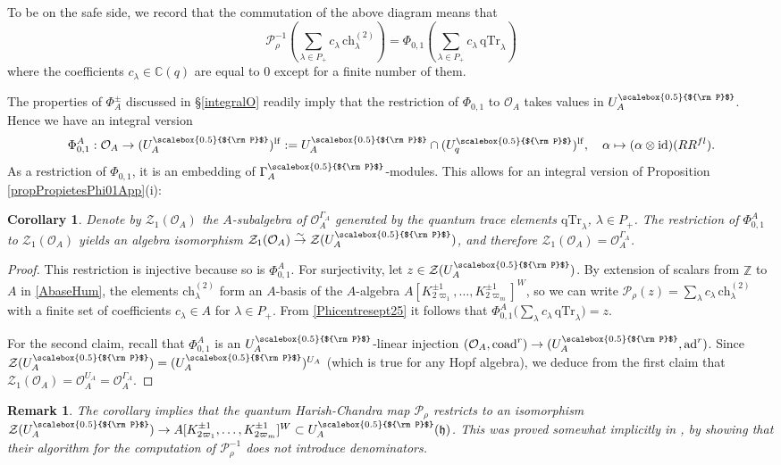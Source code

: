 \documentclass[11pt]{amsart}
\newtheorem{cor}[teo]{Corollary}
\newtheorem{remark}[teo]{Remark}
\newcommand{\Oo}{\mathcal{O}}
\newcommand{\Pup}{{\scalebox{0.5}{${\rm P}$}}}
\begin{document}
To be on the safe side, we record that the commutation of the above diagram means that
\begin{equation}\label{Phicentresept25}
\textstyle \mathcal{P}_\rho^{-1 }\left( \sum_{\lambda \in P_+} c_\lambda \, \mathrm{ch}^{(2)}_\lambda \right) =  \Phi_{0,1}\left(\sum_{\lambda \in P_+}  c_\lambda \, \mathrm{qTr}_\lambda\right)
 \end{equation} 
where the coefficients $c_\lambda \in \mathbb{C}(q)$ are equal to $0$ except for a finite number of them.

\smallskip

\indent The properties of $\Phi_A^\pm$ discussed in \S\ref{integralO} readily imply that the restriction of $\Phi_{0,1}$ to $\mathcal{O}_A$ takes values in $U_A^\Pup$. Hence we have an integral version
\[ \Phi_{0,1}^A : \Oo_A \to (U_A^\Pup)^{\mathrm{lf}} := U_A^\Pup\cap (U_q^\Pup)^{\rm lf}, \quad \alpha \mapsto (\alpha \otimes \mathrm{id})(RR^{fl}). \]
As a restriction of $\Phi_{0,1}$, it is an embedding of $\Gamma_A^\Pup$-modules. This allows for an integral version of Proposition \ref{propPropietesPhi01App}(i):
\begin{cor}\label{Phi0Aiso} Denote by $\mathcal{Z}_1(\Oo_A)$ the $A$-subalgebra of $\Oo_A^{\Gamma_A}$ generated by the quantum trace elements $\mathrm{qTr}_\lambda$, $\lambda \in P_+$. The restriction of $\Phi_{0,1}^A$ to $\mathcal{Z}_1(\Oo_A)$ yields an algebra isomorphism $\mathcal{Z}_1(\Oo_A) \overset{\sim}{\to} \mathcal{Z}(U_A^\Pup)$, and therefore $\mathcal{Z}_1(\Oo_A)=\Oo_A^{\Gamma_A}$.
\end{cor}

\begin{proof} This restriction is injective because so is $\Phi_{0,1}^A$. For surjectivity, let $z\in \mathcal{Z}(U_A^\Pup)$. By extension of scalars from $\mathbb{Z}$ to $A$ in \eqref{AbaseHum}, the elements $\textstyle \mathrm{ch}^{(2)}_\lambda$ form an $A$-basis of the $A$-algebra $A[K_{2\varpi_1}^{\pm 1},\ldots, K_{2\varpi_m}^{\pm 1}]^W$, so we can write $\textstyle \mathcal{P}_\rho(z) =  \sum_\lambda  c_\lambda\, \mathrm{ch}^{(2)}_\lambda$ with a finite set of coefficients $c_\lambda\in A$ for $\lambda\in P_+$. From \eqref{Phicentresept25} it follows that $\textstyle \Phi_{0,1}^A\bigl(\sum_\lambda  c_\lambda\, \mathrm{qTr}_\lambda\bigr) = z$.

For the second claim, recall that $\Phi_{0,1}^A$ is an $U_A^\Pup$-linear injection $(\mathcal{O}_A, \mathrm{coad}^r) \to (U_A^\Pup, \mathrm{ad}^r)$. Since $\mathcal{Z}(U_A^\Pup) = (U_A^\Pup)^{U_A}$ (which is true for any Hopf algebra), we deduce from the first claim that $\mathcal{Z}_1(\mathcal{O}_A) = \mathcal{O}_A^{U_A} = \mathcal{O}_A^{\Gamma_A}$.
\end{proof}
\begin{remark}\label{rkZ1OAjanv26} {\rm The corollary implies that the quantum Harish-Chandra map $\mathcal{P}_\rho$ restricts to an isomorphism $\mathcal{Z}(U_A^\Pup) \to A[K_{2\varpi_1}^{\pm 1},\ldots, K_{2\varpi_m}^{\pm 1}]^W \subset U_A^\Pup(\mathfrak{h})$. This was proved somewhat implicitly in \cite[Th. 18.3 and \S 21]{DCP} , by showing that their algorithm for the computation of $\mathcal{P}_\rho^{-1}$ does not introduce denominators.}
\end{remark}
\end{document}
